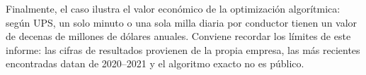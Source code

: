 \documentclass[11pt,a4paper]{article}
\begin{document}
Finalmente, el caso ilustra el valor económico de la optimización algorítmica: según UPS, un solo minuto o una sola milla diaria por conductor tienen un valor de decenas de millones de dólares anuales. Conviene recordar los límites de este informe: las cifras de resultados provienen de la propia empresa, las más recientes encontradas datan de 2020--2021 y el algoritmo exacto no es público.

\printbibliography[title={Referencias bibliográficas}]
\end{document}
